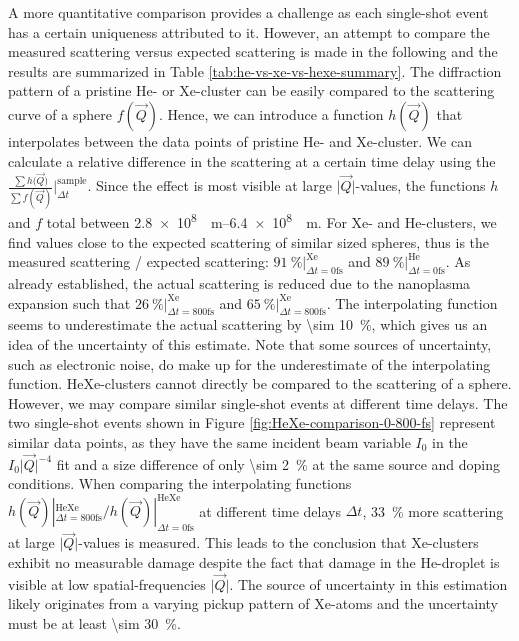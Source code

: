 A more quantitative comparison provides a challenge as each single-shot event has a certain uniqueness attributed to it. However, an attempt to compare the measured scattering versus expected scattering is made in the following and the results are summarized in Table \ref{tab:he-vs-xe-vs-hexe-summary}. The diffraction pattern of a pristine He- or Xe-cluster can be easily compared to the scattering curve of a sphere $f(\vec{Q})$. Hence, we can introduce a function $h(\vec{Q})$ that interpolates between the data points of pristine He- and Xe-cluster. We can calculate a relative difference in the scattering at a certain time delay using the $\tfrac{\sum{h(\vec{Q}})}{\sum{f(\vec{Q})}}|_{\Delta t}^{\text{sample}}$. Since the effect is most visible at large $\lvert\vec{Q}\rvert$-values, the functions $h$ and $f$ total between \SIrange[scientific-notation = fixed, fixed-exponent = 8]{2.8e8}{6.4e8}{\per\meter}. For Xe- and He-clusters, we find values close to the expected scattering of similar sized spheres, thus is the measured scattering / expected scattering: $\SI{91}{\percent} |_{\Delta t = 0 \text{fs}}^{\text{Xe}}$ and $\SI{89}{\percent}|_{\Delta t=0 \text{fs}}^{\text{He}}$. As already established, the actual scattering is reduced due to the nanoplasma expansion such that $\SI{26}{\percent} |_{\Delta t = 800 \text{fs}}^{\text{Xe}}$ and $\SI{65}{\percent} |_{\Delta t = 800 \text{fs}}^{\text{Xe}}$. The interpolating function seems to underestimate the actual scattering by \SI{\sim 10}{\percent}, which gives us an idea of the uncertainty of this estimate. Note that some sources of uncertainty, such as electronic noise, do make up for the underestimate of the interpolating function. HeXe-clusters cannot directly be compared to the scattering of a sphere. However, we may compare similar single-shot events at different time delays. The two single-shot events shown in Figure \ref{fig:HeXe-comparison-0-800-fs} represent similar data points, as they have the same incident beam variable $I_{0}$ in the $I_{0} \lvert\vec{Q}\rvert^{-4}$ fit and a size difference of only \SI{\sim 2}{\percent} at the same source and doping conditions. When comparing the interpolating functions $h(\vec{Q}) |_{\Delta t = 800 \text{fs}}^{\text{HeXe}}/h(\vec{Q}) |_{\Delta t = 0 \text{fs}}^{\text{HeXe}}$ at different time delays $\Delta t$, \SI{33}{\percent} more scattering at large $\lvert\vec{Q}\rvert$-values is measured. This leads to the conclusion that Xe-clusters exhibit no measurable damage despite the fact that damage in the He-droplet is visible at low spatial-frequencies $\lvert\vec{Q}\rvert$. The source of uncertainty in this estimation likely originates from a varying pickup pattern of Xe-atoms and the uncertainty must be at least \SI{\sim 30}{\percent}.\\[1\baselineskip]
